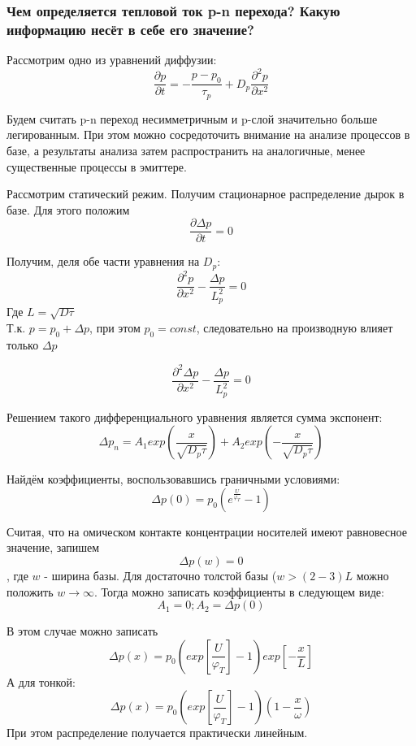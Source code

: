 \subsubsection{Чем определяется тепловой ток p-n перехода? Какую информацию несёт в себе его значение?}

Рассмотрим одно из уравнений диффузии:
\begin{equation}
\frac{\partial p}{\partial t} = - \frac{p - p_0}{\tau_p} + D_p\frac{\partial^2p}{\partial x^2}
\end{equation}

Будем считать p-n переход несимметричным и p-слой значительно больше легированным. При этом можно сосредоточить внимание на анализе процессов в базе, а результаты анализа затем распространить на аналогичные, менее существенные процессы в эмиттере.

Рассмотрим статический режим. Получим стационарное распределение дырок в базе. Для этого положим
$$
\frac{\partial \Delta p}{\partial t} = 0
$$

Получим, деля обе части уравнения на $D_p$: 
$$
\frac{\partial^2p}{\partial x^2} - \frac{\Delta p}{L_p^2} = 0
$$
Где $L = \sqrt{D \tau}$\\
Т.к. $p = p_0 + \Delta p$, при этом $p_0 = const$, следовательно на производную влияет только $\Delta p$

$$
\frac{\partial^2\Delta p}{\partial x^2} - \frac{\Delta p}{L_p^2} = 0
$$

Решением такого дифференциального уравнения является сумма экспонент:
$$
\Delta p_n = A_1 exp\left(\frac{x}{\sqrt{D_p\tau}}\right) + A_2 exp\left(-\frac{x}{\sqrt{D_p\tau}}\right)
$$

Найдём коэффициенты, воспользовавшись граничными условиями:
$$
\Delta p(0) = p_0\left(e^{\frac{U}{\varphi_T}} - 1\right)
$$

Считая, что на омическом контакте концентрации носителей имеют равновесное значение, запишем
$$
\Delta p(w) = 0
$$, где $w$ - ширина базы.
Для достаточно толстой базы ($w > (2-3)L$ можно положить $w \rightarrow \infty$. Тогда можно записать коэффициенты в следующем виде:
$$
A_1 = 0; A_2 = \Delta p(0)
$$

В этом случае можно записать
$$
\Delta p(x) = p_0 \left(exp\left[\frac{U}{\varphi_T}\right] -1 \right) exp\left[-\frac{x}{L}\right]
$$
А для тонкой:
\begin{equation}
\Delta p(x) = p_0 \left(exp\left[\frac{U}{\varphi_T}\right] -1 \right) (1 - \frac{x}{\omega})
\end{equation}
При этом распределение получается практически линейным.\\

